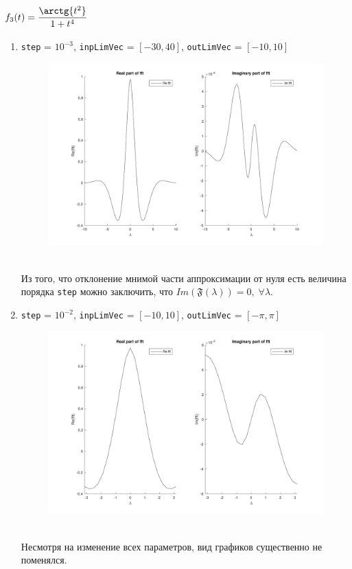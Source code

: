 \documentclass[11pt, oneside, final]{article}
\numberwithin{equation}{section}
\newcommand \four[1][\lambda]{\mathfrak{F}(#1)}
\begin{document}
    \subsection{\( f_3(t) = \dfrac{\arctg{t^2}}{1 + t^4}\)} %
    \label{sub:f3}
    \begin{enumerate}
        \item
        \label{it:f31}
        \texttt{step} = \(10^{-3}\), \texttt{inpLimVec} = \( [-30, 40] \), \texttt{outLimVec} = \( [-10, 10] \)
        \begin{figure}[!h]
            \centering
            \includegraphics[width=\linewidth]{f3fig1}
            \label{pic:f3:1}
        \end{figure} \\
        Из того, что отклонение мнимой части аппроксимации от нуля есть величина порядка \texttt{step} можно заключить,
        что \(Im(\four) = 0, \; \forall \lambda \). 
        \clearpage
        \item
        \label{it:f32}
        \texttt{step} = \(10^{-2}\), \texttt{inpLimVec} = \( [-10, 10] \), \texttt{outLimVec} = \( [-\pi, \pi] \)
        \begin{figure}[!h]
            \centering
            \includegraphics[width=\linewidth]{f3fig2}
            \label{pic:f3:2}
        \end{figure} \\
        Несмотря на изменение всех параметров, вид графиков существенно не поменялся.
    \label{sub:f3}
    \end{enumerate}
    \clearpage
\end{document}
